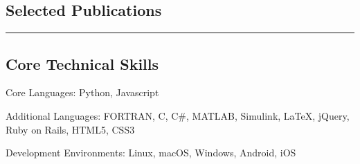 \documentclass[10pt,letterpaper]{article}
\newenvironment{indentsection}[1]%
{\begin{list}{}%
	{\setlength{\leftmargin}{#1}}%
	\item[]%
}
{\end{list}}
\newcommand{\CPP}
{C\nolinebreak[4]\hspace{-.05em}\raisebox{.22ex}{\footnotesize\bf ++}}
\begin{document}
\subsection*{Selected Publications}

\nocite{*}
\renewcommand{\section}[2]{}%



\hrule
\vspace{-0.4em}
\subsection*{Core Technical Skills}

\begin{indentsection}{\parindent}
\begin{description*}
	\item[Core Languages:]
	Python, Javascript
	\item[Additional Languages:]
	FORTRAN, \CPP, C#, MATLAB, Simulink, \LaTeX, jQuery, Ruby on Rails, HTML5, CSS3
	\item[Development Environments:]
	Linux, macOS, Windows, Android, iOS
\end{description*}
\end{indentsection}
\end{document}
